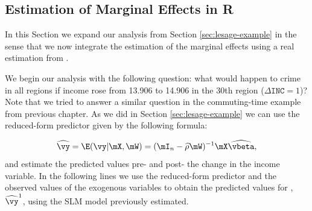 \subsection{Estimation of Marginal Effects in R}

In this Section we expand our analysis from Section \ref{sec:lesage-example} in the sense that we now integrate the estimation of the marginal effects using a real estimation from . 

We begin our analysis with the following question: what would happen to crime in all regions if income rose from 13.906 to 14.906 in the 30th region ($\Delta\texttt{INC} = 1$)? Note that we tried to answer a similar question in the commuting-time example from previous chapter. As we did in Section \ref{sec:lesage-example} we can use the reduced-form predictor given by the following formula:

\begin{equation*}
\widehat{\vy} = \E(\vy| \mX, \mW) = (\mI_n - \widehat{\rho}\mW)^{-1}\mX\widehat{\vbeta},
\end{equation*}
% 
and estimate the predicted values pre- and post- the change in the income variable. In the following lines we use the reduced-form predictor and the observed values of the exogenous variables to obtain the predicted values for , $\widehat{\vy}^1$,  using the SLM model previously estimated. 
  
\begin{knitrout}
\color{fgcolor}
\end{knitrout}

